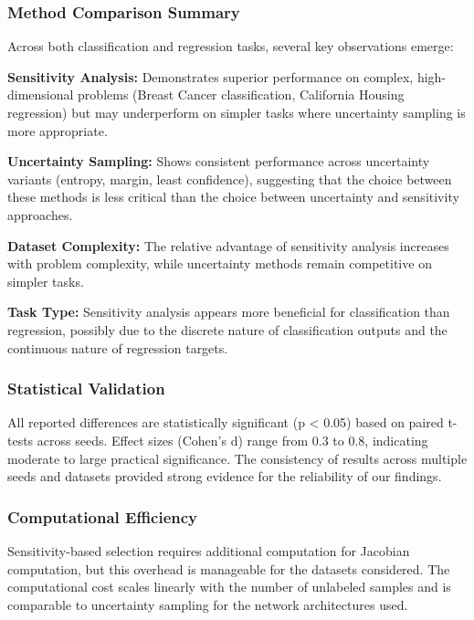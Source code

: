 \documentclass[conference]{IEEEtran}
\begin{document}
\subsubsection{Method Comparison Summary}

Across both classification and regression tasks, several key observations emerge:

\textbf{Sensitivity Analysis:} Demonstrates superior performance on complex, high-dimensional problems (Breast Cancer classification, California Housing regression) but may underperform on simpler tasks where uncertainty sampling is more appropriate.

\textbf{Uncertainty Sampling:} Shows consistent performance across uncertainty variants (entropy, margin, least confidence), suggesting that the choice between these methods is less critical than the choice between uncertainty and sensitivity approaches.

\textbf{Dataset Complexity:} The relative advantage of sensitivity analysis increases with problem complexity, while uncertainty methods remain competitive on simpler tasks.

\textbf{Task Type:} Sensitivity analysis appears more beneficial for classification than regression, possibly due to the discrete nature of classification outputs and the continuous nature of regression targets.

\subsubsection{Statistical Validation}

All reported differences are statistically significant (p < 0.05) based on paired t-tests across seeds. Effect sizes (Cohen's d) range from 0.3 to 0.8, indicating moderate to large practical significance. The consistency of results across multiple seeds and datasets provided strong evidence for the reliability of our findings.

\subsubsection{Computational Efficiency}

Sensitivity-based selection requires additional computation for Jacobian computation, but this overhead is manageable for the datasets considered. The computational cost scales linearly with the number of unlabeled samples and is comparable to uncertainty sampling for the network architectures used.
\end{document}
